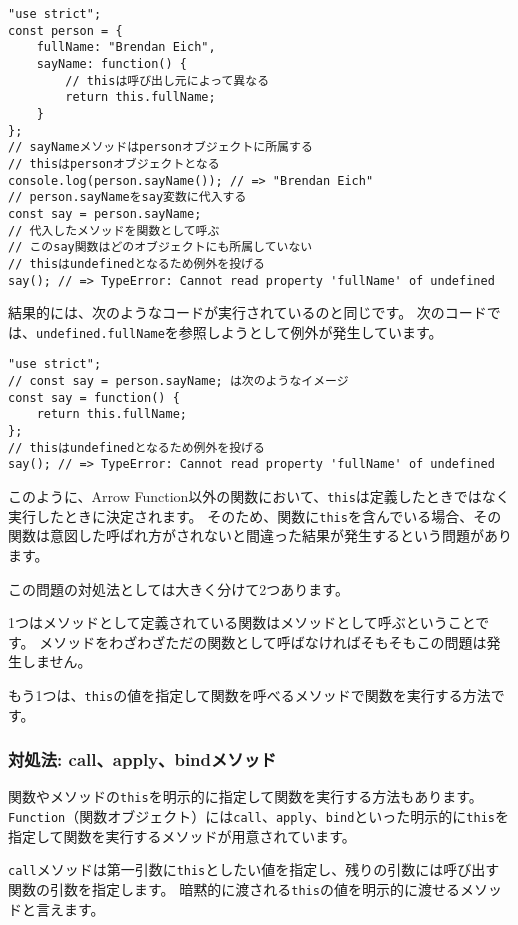 \begin{lstlisting}
"use strict";
const person = {
    fullName: "Brendan Eich",
    sayName: function() {
        // thisは呼び出し元によって異なる
        return this.fullName;
    }
};
// sayNameメソッドはpersonオブジェクトに所属する
// thisはpersonオブジェクトとなる
console.log(person.sayName()); // => "Brendan Eich"
// person.sayNameをsay変数に代入する
const say = person.sayName;
// 代入したメソッドを関数として呼ぶ
// このsay関数はどのオブジェクトにも所属していない
// thisはundefinedとなるため例外を投げる
say(); // => TypeError: Cannot read property 'fullName' of undefined
\end{lstlisting}

結果的には、次のようなコードが実行されているのと同じです。
次のコードでは、\texttt{undefined.fullName}を参照しようとして例外が発生しています。

\begin{lstlisting}
"use strict";
// const say = person.sayName; は次のようなイメージ
const say = function() {
    return this.fullName;
};
// thisはundefinedとなるため例外を投げる
say(); // => TypeError: Cannot read property 'fullName' of undefined
\end{lstlisting}

このように、Arrow
Function以外の関数において、\texttt{this}は定義したときではなく実行したときに決定されます。
そのため、関数に\texttt{this}を含んでいる場合、その関数は意図した呼ばれ方がされないと間違った結果が発生するという問題があります。

この問題の対処法としては大きく分けて2つあります。

1つはメソッドとして定義されている関数はメソッドとして呼ぶということです。
メソッドをわざわざただの関数として呼ばなければそもそもこの問題は発生しません。

もう1つは、\texttt{this}の値を指定して関数を呼べるメソッドで関数を実行する方法です。

\hypertarget{call-apply-bind}{%
\subsubsection{対処法:
call、apply、bindメソッド}\label{call-apply-bind}}

関数やメソッドの\texttt{this}を明示的に指定して関数を実行する方法もあります。
\texttt{Function}（関数オブジェクト）には\texttt{call}、\texttt{apply}、\texttt{bind}といった明示的に\texttt{this}を指定して関数を実行するメソッドが用意されています。

\texttt{call}メソッドは第一引数に\texttt{this}としたい値を指定し、残りの引数には呼び出す関数の引数を指定します。
暗黙的に渡される\texttt{this}の値を明示的に渡せるメソッドと言えます。

